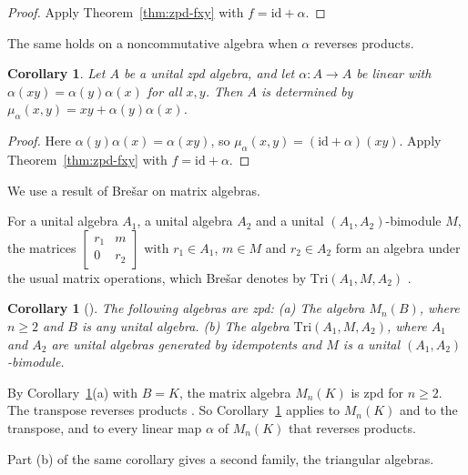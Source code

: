 \documentclass[]{interact}
\theoremstyle{plain}
\newtheorem{corollary}[theorem]{Corollary}
\theoremstyle{definition}
\theoremstyle{remark}
\begin{document}
\begin{proof}
Apply Theorem~\ref{thm:zpd-fxy} with $f = \mathrm{id} + \alpha$.
\end{proof}

The same holds on a noncommutative algebra when $\alpha$ reverses products. %

\begin{corollary}\label{cor:anti}
Let $A$ be a unital zpd algebra, and let $\alpha \colon A \to A$ be linear with $\alpha(xy) = \alpha(y)\alpha(x)$ for all $x, y$.
Then $A$ is determined by $\mu_\alpha(x,y) = xy + \alpha(y)\alpha(x)$.
\end{corollary}

\begin{proof}
Here $\alpha(y)\alpha(x) = \alpha(xy)$, so $\mu_\alpha(x,y) = (\mathrm{id} + \alpha)(xy)$.
Apply Theorem~\ref{thm:zpd-fxy} with $f = \mathrm{id} + \alpha$.
\end{proof}

We use a result of Bre\v{s}ar on matrix algebras.

For a unital algebra $A_1$, a unital algebra $A_2$ and a unital $(A_1, A_2)$-bimodule $M$, the matrices $\left[\begin{smallmatrix} r_1 & m \\ 0 & r_2 \end{smallmatrix}\right]$ with $r_1 \in A_1$, $m \in M$ and $r_2 \in A_2$ form an algebra under the usual matrix operations, which Bre\v{s}ar denotes by $\mathrm{Tri}(A_1, M, A_2)$ \citep[\S2.1]{Bresar2021}.

\begin{corollary}[{\citep[Corollary 2.17]{Bresar2021}}]\label{cor:bresar-matrix}
The following algebras are zpd:
(a) The algebra $M_n(B)$, where $n \geq 2$ and $B$ is any unital algebra.
(b) The algebra $\mathrm{Tri}(A_1, M, A_2)$, where $A_1$ and $A_2$ are unital algebras generated by idempotents and $M$ is a unital $(A_1, A_2)$-bimodule.
\end{corollary}

By Corollary~\ref{cor:bresar-matrix}(a) with $B = K$, the matrix algebra $M_n(K)$ is zpd for $n \geq 2$.
The transpose reverses products \citep[\S 0.2.5]{HornJohnson2013}.
So Corollary~\ref{cor:anti} applies to $M_n(K)$ and to the transpose, and to every linear map $\alpha$ of $M_n(K)$ that reverses products.

Part (b) of the same corollary gives a second family, the triangular algebras.
\end{document}
